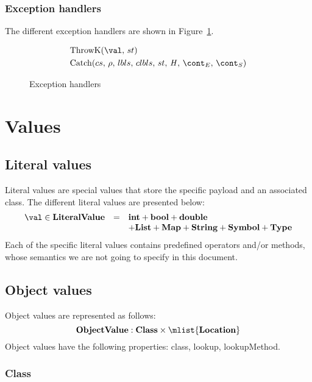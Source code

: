 \documentclass{article}
\begin{document}
\subsubsection{Exception handlers}
\label{subsubsec:exception-handlers}
The different exception handlers are shown in Figure~\ref{figure:handlers}.
\newcommand{\ThrowH}[2]{\mathrm{ThrowK}({#1},\,{#2})}
\newcommand{\CatchH}[1]{\mathrm{Catch}({#1},\,\env,\,\lbls,\,\clbls,\,\strace,\,\handler,\,\econt,\,\scont)}

\begin{figure}[Htp]
  \begin{align}
    &\ThrowH{\val}{\strace} \label{handle:throw} \\
    &\CatchH{cs} \label{handle:catch}
  \end{align}
  \caption{Exception handlers}
  \label{figure:handlers}
\end{figure}

\section{Values}
\label{sec:values}
\subsection{Literal values}
\label{subsubsec:literal-values}
Literal values are special values that store the specific payload and an associated class.
The different literal values are presented below:
\[
  \begin{array}{lcl}
	\val \in \dlitval &=& \mathbf{int} + \mathbf{bool} + \mathbf{double}\\
	&& + \mathbf{List} + \mathbf{Map} + \mathbf{String} + \mathbf{Symbol} + \mathbf{Type}
  \end{array}
\]
Each of the specific literal values contains predefined operators and/or methods, whose semantics we are not going to specify in this document.
\subsection{Object values}
\label{subsec:object-values}
Object values are represented as follows:
\[
	\dobjval : \dclass \times \mlist{\dlocation}\\
\]
Object values have the following properties: class, lookup, lookupMethod. %
\subsubsection{Class}
\label{subsubsec:class}
\end{document}
